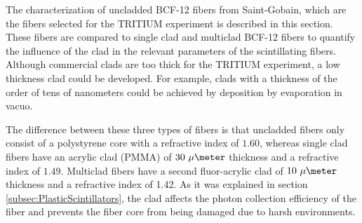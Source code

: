 The characterization of uncladded BCF-12 fibers from Saint-Gobain, which are the fibers selected for the TRITIUM experiment is described in this section. These fibers are compared to single clad and multiclad BCF-12 fibers to quantify the influence of the clad in the relevant parameters of the scintillating fibers. Although commercial clads are too thick for the TRITIUM experiment, a low thickness clad could be developed. For example, clads with a thickness of the order of tens of nanometers could be achieved by deposition by evaporation in vacuo. 

The difference between these three types of fibers is that uncladded fibers only consist of a polystyrene core with a refractive index of $1.60$, whereas single clad fibers have an acrylic clad (PMMA) of $30~\mu\meter$ thickness and a refractive index of $1.49$. Multiclad fibers have a second fluor-acrylic clad of $10~\mu\meter$ thickness  and a refractive index of 1.42. As it was explained in section \ref{subsec:PlasticScintillators}, the clad affects the photon collection efficiency of the fiber and prevents the fiber core from being damaged due to harsh environments.




